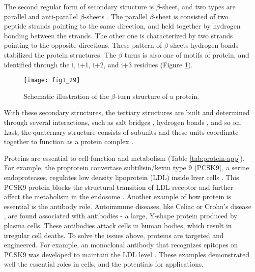 \begin{refsection}
The second regular form of secondary structure is $\beta$-sheet, and two types
are parallel and anti-parallel $\beta$-sheets \cite{Astbury1932}. The parallel
$\beta$-sheet is consisted of two peptide strands pointing to the same
direction, and held together by hydrogen bonding between the strands.  The
other one is characterized by two strands pointing to the opposite directions. These
pattern of $\beta$-sheets hydrogen bonds stabilized the protein structures. The
$\beta$ turns is also one of motifs of protein, and identified through the i,
i+1, i+2, and i+3 residues \cite{Nemethy1972} (Figure \ref{fig:beta-turn}). 
\begin{figure}[htbp] 
    \centering \texttt{[image: fig1\_29]}
    \caption[Schematic illustration of the $\beta$-turn structure of a
    protein.]{Schematic illustration of the $\beta$-turn structure of a
        protein\cite{Nemethy1972}.} 
    \label{fig:beta-turn}
\end{figure}

With these secondary structures, the tertiary structures are built and
determined through several interactions, such as salt bridges
\cite{Privalov2009}, hydrogen bonds \cite{Sheridan1982}, and so on.
Last, the quaternary structure consists of subunits and these units coordinate
together to function as a protein complex \cite{Privalov2009}.

Proteins are essential to cell function and metabolism
\cite{Lambert2012,Horton2007,Dessein2008} (Table \ref{tab:protein-app}). For
example, the proprotein convertase subtilisin/kexin type 9 (PCSK9), a serine
endoproteases, regulates low density lipoprotein (LDL) inside liver
cells \cite{Lambert2012,Horton2007}. This PCSK9 protein blocks the structural
transition of LDL receptor and further affect the metabolism in the endosome
\cite{Lambert2012}. Another example of how protein is essential is the antibody
role. Autoimmune diseases, like Celiac \cite{Dessein2008} or
Crohn's disease \cite{Sollid2005, Meize-Grochowski}, are found associated with
antibodies - a large, Y-shape protein produced by plasma cells. These
antibodies attack cells in human bodies, which result in irregular cell
deaths. To solve the issues above, proteins are targeted and
engineered. For example, an monoclonal antibody that recognizes epitopes on
PCSK9 was developed to maintain the LDL level \cite{Lambert2012}. These
examples demonstrated well the essential roles in cells, and the potentials for
applications.   


\end{refsection}
